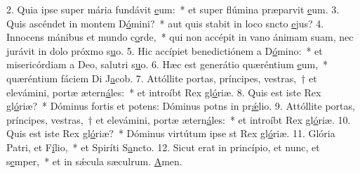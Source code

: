 2. Quia ipse super mária fundávit \uline{e}um:~* et super flúmina præparvit \uline{e}um.
3. Quis ascéndet in montem D\uline{ó}mini?~* aut quis stabit in loco sncto \uline{e}jus?
4. Innocens mánibus et mundo c\uline{o}rde,~* qui non accépit in vano ánimam suam, nec jurávit in dolo próxmo s\uline{u}o.
5. Hic accípiet benedictiónem a D\uline{ó}mino:~* et misericórdiam a Deo, salutri s\uline{u}o.
6. Hæc est generátio quæréntium \uline{e}um,~* quæréntium fáciem Di J\uline{a}cob.
7. Attóllite portas, príncipes, vestras,~† et elevámini, portæ ætern\uline{á}les:~* et introíbt Rex gl\uline{ó}riæ.
8. Quis est iste Rex gl\uline{ó}riæ?~* Dóminus fortis et potens: Dóminus potns in pr\uline{ǽ}lio.
9. Attóllite portas, príncipes, vestras,~† et elevámini, portæ ætern\uline{á}les:~* et introíbt Rex gl\uline{ó}riæ.
10. Quis est iste Rex gl\uline{ó}riæ?~* Dóminus virtútum ipse st Rex gl\uline{ó}riæ.
11. Glória Patri, et F\uline{í}lio,~* et Spiríti S\uline{a}ncto.
12. Sicut erat in princípio, et nunc, et s\uline{e}mper,~* et in sǽcula sæculrum. \uline{A}men.
